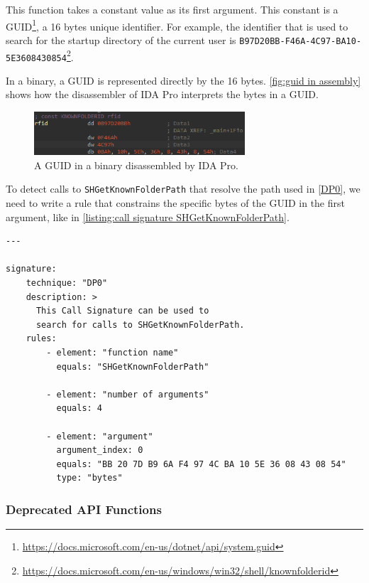 This function takes a constant value as its first argument. This constant is a GUID\footnote{\tiny \url{https://docs.microsoft.com/en-us/dotnet/api/system.guid}}, a 16 bytes unique identifier. For example, the identifier that is used to search for the startup directory of the current user is \texttt{B97D20BB-F46A-4C97-BA10-5E3608430854}\footnote{\tiny \url{https://docs.microsoft.com/en-us/windows/win32/shell/knownfolderid}}.

In a binary, a GUID is represented directly by the 16 bytes. \autoref{fig:guid in assembly} shows how the disassembler of IDA Pro interprets the bytes in a GUID.

\begin{figure}[ht]
  \centering
  \includegraphics[width=0.7\textwidth]{resources/images/guid_in_assembly.png}
  \caption{A GUID in a binary disassembled by IDA Pro.}
  \label{fig:guid in assembly}
\end{figure}

To detect calls to \texttt{SHGetKnownFolderPath} that resolve the path used in \autoref{DP0}, we need to write a rule that constrains the specific bytes of the GUID in the first argument, like in \autoref{listing:call signature SHGetKnownFolderPath}.

\begin{lstlisting}[label={listing:call signature SHGetKnownFolderPath}, caption={A Call Signature that matches a call to \texttt{SHGetKnownFolderPath}.}, captionpos=b]
---

signature:
    technique: "DP0"
    description: >
      This Call Signature can be used to
      search for calls to SHGetKnownFolderPath.
    rules:
        - element: "function name"
          equals: "SHGetKnownFolderPath"

        - element: "number of arguments"
          equals: 4

        - element: "argument"
          argument_index: 0
          equals: "BB 20 7D B9 6A F4 97 4C BA 10 5E 36 08 43 08 54"
          type: "bytes"
\end{lstlisting}

\subsubsection{Deprecated API Functions}

